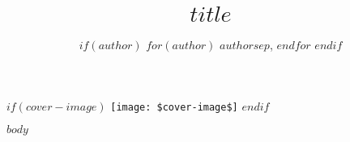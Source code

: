 \documentclass[
$if(fontsize)$
$fontsize$,
$endif$
$if(lang)$
$babel-lang$,
$endif$
$if(papersize)$
$papersize$paper,
$endif$
$if(beamer)$
ignorenonframetext,
$if(handout)$
handout,
$endif$
$if(aspectratio)$
aspectratio=$aspectratio$,
$endif$
$endif$
$for(classoption)$
$classoption$$sep$,
$endfor$
]{$documentclass$}
\title{$title$}
\author{$if(author)$
$for(author)$
$author$$sep$,
$endfor$
$endif$}
\date{}
\begin{document}
    $if(cover-image)$
    \thispagestyle{empty}
    {\centering\texttt{[image: \$cover-image\$]}}
    $endif$
    \maketitle
	$body$	
\end{document}
